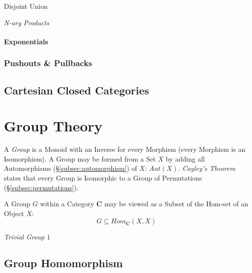 Disjoint Union %

\emph{N-ary Products}

\paragraph{Exponentials}\label{subsec:category_exponential}

\subsubsection{Pushouts \& Pullbacks}\label{subsec:category_pullback}

\subsection{Cartesian Closed Categories}\label{subsec:cartesian_category}

\section{Group Theory}

A \emph{Group} is a Monoid with an Inverse for every Morphism (every
Morphism is an Isomorphism). A Group may be formed from a Set $X$ by
adding all Automorphisms (\S\ref{subsec:automorphism}) of $X$:
$Aut(X)$. \emph{Cayley's Theorem} states that every Group is
Isomorphic to a Group of Permutations (\S\ref{subsec:permutations}).

A Group $G$ within a Category $\mathbf{C}$ may be viewed as a Subset
of the Hom-set of an Object $X$:
\[
    G \subseteq Hom_{\mathbf{C}}(X,X)
\]

\emph{Trivial Group} ${1}$

\subsection{Group Homomorphism}\label{subsec:group_homomorphism}


